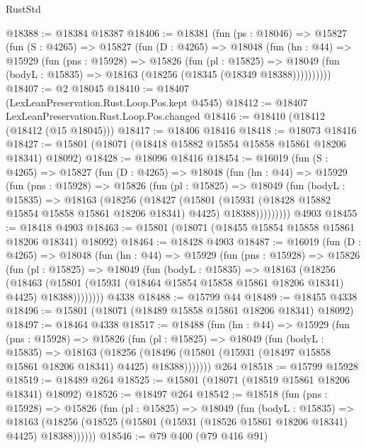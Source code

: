 \begin{lexlean}{RustStd}
\begin{coremodule}
@18388 := @18384 @18387
@18406 := @18381
    (fun (ps : @18046) =>
    @15827
      (fun (S : @4265) =>
      @15827
        (fun (D : @4265) =>
        @18048
          (fun (hn : @44) =>
          @15929
            (fun (pns : @15928) =>
            @15826
              (fun (pl : @15825) =>
              @18049 (fun (bodyL : @15835) => @18163 (@18256 (@18345 (@18349 @18388))))))))))
@18407 := @2 @18045
@18410 := @18407 (LexLeanPreservation.Rust.Loop.Pos.kept @4545)
@18412 := @18407 LexLeanPreservation.Rust.Loop.Pos.changed
@18416 := @18410 (@18412 (@18412 (@15 @18045)))
@18417 := @18406 @18416
@18418 := @18073 @18416
@18427 := @15801 (@18071 (@18418 @15882 @15854 @15858 @15861 @18206 @18341) @18092)
@18428 := @18096 @18416
@18454 := @16019
    (fun (S : @4265) =>
    @15827
      (fun (D : @4265) =>
      @18048
        (fun (hn : @44) =>
        @15929
          (fun (pns : @15928) =>
          @15826
            (fun (pl : @15825) =>
            @18049
              (fun (bodyL : @15835) =>
              @18163
                (@18256
                  (@18427
                    (@15801
                      (@15931 (@18428 @15882 @15854 @15858 @15861 @18206 @18341) @4425)
                      @18388)))))))))
    @4903
@18455 := @18418 @4903
@18463 := @15801 (@18071 (@18455 @15854 @15858 @15861 @18206 @18341) @18092)
@18464 := @18428 @4903
@18487 := @16019
    (fun (D : @4265) =>
    @18048
      (fun (hn : @44) =>
      @15929
        (fun (pns : @15928) =>
        @15826
          (fun (pl : @15825) =>
          @18049
            (fun (bodyL : @15835) =>
            @18163
              (@18256
                (@18463
                  (@15801 (@15931 (@18464 @15854 @15858 @15861 @18206 @18341) @4425) @18388))))))))
    @4338
@18488 := @15799 @44
@18489 := @18455 @4338
@18496 := @15801 (@18071 (@18489 @15858 @15861 @18206 @18341) @18092)
@18497 := @18464 @4338
@18517 := @18488
    (fun (hn : @44) =>
    @15929
      (fun (pns : @15928) =>
      @15826
        (fun (pl : @15825) =>
        @18049
          (fun (bodyL : @15835) =>
          @18163
            (@18256
              (@18496 (@15801 (@15931 (@18497 @15858 @15861 @18206 @18341) @4425) @18388)))))))
    @264
@18518 := @15799 @15928
@18519 := @18489 @264
@18525 := @15801 (@18071 (@18519 @15861 @18206 @18341) @18092)
@18526 := @18497 @264
@18542 := @18518
    (fun (pns : @15928) =>
    @15826
      (fun (pl : @15825) =>
      @18049
        (fun (bodyL : @15835) =>
        @18163 (@18256 (@18525 (@15801 (@15931 (@18526 @15861 @18206 @18341) @4425) @18388))))))
@18546 := @79 @400 (@79 @416 @91)

\end{coremodule}
\end{lexlean}
